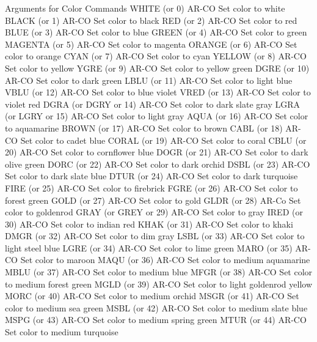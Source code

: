 Arguments for Color Commands
WHITE   (or 0)              AR-CO Set color to white
BLACK   (or 1)              AR-CO Set color to black
RED     (or 2)              AR-CO Set color to red
BLUE    (or 3)              AR-CO Set color to blue
GREEN   (or 4)              AR-CO Set color to green
MAGENTA (or 5)              AR-CO Set color to magenta
ORANGE  (or 6)              AR-CO Set color to orange
CYAN    (or 7)              AR-CO Set color to cyan
YELLOW  (or 8)              AR-CO Set color to yellow
YGRE    (or 9)              AR-CO Set color to yellow green
DGRE    (or 10)             AR-CO Set color to dark green
LBLU    (or 11)             AR-CO Set color to light blue
VBLU    (or 12)             AR-CO Set color to blue violet
VRED    (or 13)             AR-CO Set color to violet red
DGRA    (or DGRY or 14)     AR-CO Set color to dark slate gray
LGRA    (or LGRY or 15)     AR-CO Set color to light gray
AQUA    (or 16)             AR-CO Set color to aquamarine
BROWN   (or 17)             AR-CO Set color to brown
CABL    (or 18)             AR-CO Set color to cadet blue
CORAL   (or 19)             AR-CO Set color to coral
CBLU    (or 20)             AR-CO Set color to cornflower blue
DOGR    (or 21)             AR-CO Set color to dark olive green
DORC    (or 22)             AR-CO Set color to dark orchid
DSBL    (or 23)             AR-CO Set color to dark slate blue
DTUR    (or 24)             AR-CO Set color to dark turquoise
FIRE    (or 25)             AR-CO Set color to firebrick
FGRE    (or 26)             AR-CO Set color to forest green
GOLD    (or 27)             AR-CO Set color to gold
GLDR    (or 28)             AR-Co Set color to goldenrod
GRAY    (or GREY or 29)     AR-CO Set color to gray
IRED    (or 30)             AR-CO Set color to indian red
KHAK    (or 31)             AR-CO Set color to khaki
DMGR    (or 32)             AR-CO Set color to dim gray
LSBL    (or 33)             AR-CO Set color to light steel blue
LGRE    (or 34)             AR-CO Set color to lime green
MARO    (or 35)             AR-CO Set color to maroon
MAQU    (or 36)             AR-CO Set color to medium aquamarine
MBLU    (or 37)             AR-CO Set color to medium blue
MFGR    (or 38)             AR-CO Set color to medium forest green
MGLD    (or 39)             AR-CO Set color to light goldenrod yellow
MORC    (or 40)             AR-CO Set color to medium orchid
MSGR    (or 41)             AR-CO Set color to medium sea green
MSBL    (or 42)             AR-CO Set color to medium slate blue
MSPG    (or 43)             AR-CO Set color to medium spring green
MTUR    (or 44)             AR-CO Set color to medium turquoise
